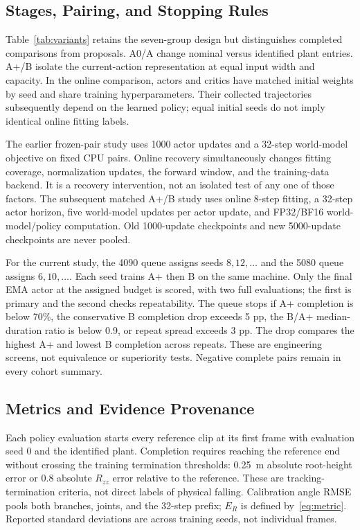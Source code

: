 


\subsection{Stages, Pairing, and Stopping Rules}
Table~\ref{tab:variants} retains the seven-group design but distinguishes completed comparisons from proposals. A0/A change nominal versus identified plant entries. A+/B isolate the current-action representation at equal input width and capacity. In the online comparison, actors and critics have matched initial weights by seed and share training hyperparameters. Their collected trajectories subsequently depend on the learned policy; equal initial seeds do not imply identical online fitting labels.

The earlier frozen-pair study uses 1000 actor updates and a 32-step world-model objective on fixed CPU pairs. Online recovery simultaneously changes fitting coverage, normalization updates, the forward window, and the training-data backend. It is a recovery intervention, not an isolated test of any one of those factors. The subsequent matched A+/B study uses online 8-step fitting, a 32-step actor horizon, five world-model updates per actor update, and FP32/BF16 world-model/policy computation. Old 1000-update checkpoints and new 5000-update checkpoints are never pooled.

For the current study, the 4090 queue assigns seeds $8,12,\ldots$ and the 5080 queue assigns $6,10,\ldots$. Each seed trains A+ then B on the same machine. Only the final EMA actor at the assigned budget is scored, with two full evaluations; the first is primary and the second checks repeatability. The queue stops if A+ completion is below 70\%, the conservative B completion drop exceeds 5 pp, the B/A+ median-duration ratio is below 0.9, or repeat spread exceeds 3 pp. The drop compares the highest A+ and lowest B completion across repeats. These are engineering screens, not equivalence or superiority tests. Negative complete pairs remain in every cohort summary.

\subsection{Metrics and Evidence Provenance}
Each policy evaluation starts every reference clip at its first frame with evaluation seed 0 and the identified plant. Completion requires reaching the reference end without crossing the training termination thresholds: 0.25~m absolute root-height error or 0.8 absolute $R_{zz}$ error relative to the reference. These are tracking-termination criteria, not direct labels of physical falling. Calibration angle RMSE pools both branches, joints, and the 32-step prefix; $E_R$ is defined by~\eqref{eq:metric}. Reported standard deviations are across training seeds, not individual frames.

